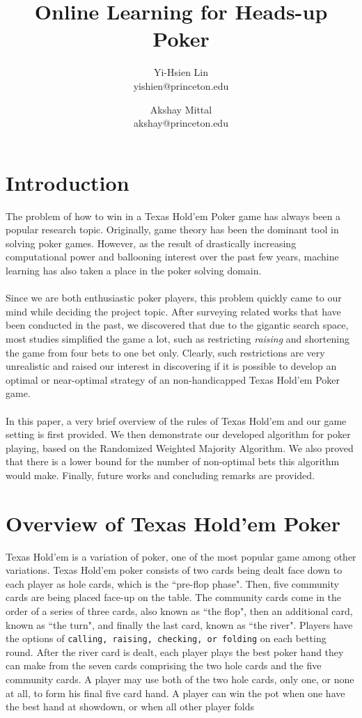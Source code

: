 \documentclass[12pt]{article}
\begin{document}
\title{Online Learning for Heads-up Poker}
\author{
	Yi-Hsien Lin \\ yishien@princeton.edu \and
	Akshay Mittal \\ akshay@princeton.edu
}
\date{}

\maketitle

\section{Introduction}
The problem of how to win in a Texas Hold'em Poker game has always been a popular research topic. Originally, game theory has been the dominant tool in solving poker games. However, as the result of drastically increasing computational power and ballooning interest over the past few years, machine learning  has also taken a place in the poker solving domain.\\
\\
Since we are both enthusiastic poker players, this problem quickly came to our mind while deciding the project topic. After surveying related works that have been conducted in the past, we discovered that due to the gigantic search space, most studies simplified the game a lot, such as restricting \emph{raising} and shortening the game from four bets to one bet only.
Clearly, such restrictions are very unrealistic and raised our interest in discovering if it is possible to develop an optimal or near-optimal strategy of an non-handicapped Texas Hold'em Poker game.\\
\\
In this paper, a very brief overview of the rules of Texas Hold'em and our game setting is first provided. We then demonstrate our developed algorithm for poker playing, based on the Randomized Weighted Majority Algorithm. We also proved that there is a lower bound for the number of non-optimal bets this algorithm would make. Finally, future works and concluding remarks are provided.


\section{Overview of Texas Hold'em Poker}
Texas Hold'em is a variation of poker, one of the most popular game among other variations. Texas Hold'em poker consists of two cards being dealt face down to each player as hole cards, which is the ``pre-flop phase". Then, five community cards are being placed face-up on the table. The community cards come in the order of a series of three cards, also known as ``the flop", then an additional card, known as ``the turn", and finally the last card, known as ``the river". Players have the options of \texttt{calling, raising, checking, or folding} on each betting round. After the river card is dealt, each player plays the best poker hand they can make from the seven cards comprising the two hole cards and the five community cards. A player may use both of the two hole cards, only one, or none at all, to form his final five card hand. A player can win the pot when one have the best hand at showdown, or when all other player folds
\end{document}
